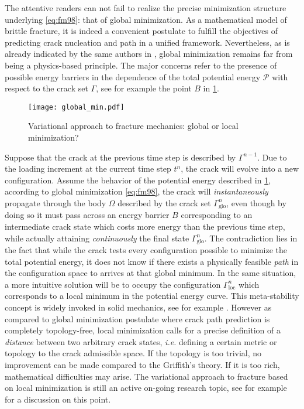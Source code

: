The attentive readers can not fail to realize the precise minimization structure underlying \eqref{eq:fm98}: that of global minimization. As a mathematical model of brittle fracture, it is indeed a convenient postulate to fulfill the objectives of predicting crack nucleation and path in a unified framework. Nevertheless, as is already indicated by the same authors in \cite{FrancfortMarigo:1998,ChambolleFrancfortMarigo:2009}, global minimization remains far from being a physics-based principle. The major concerns refer to the presence of possible energy barriers in the dependence of the total potential energy $\mathcal{P}$ with respect to the crack set $\Gamma$, see for example the point $B$ in \cref{fig:globalmin}.
\begin{figure}[htbp]
\centering
\texttt{[image: global\_min.pdf]}
\caption{Variational approach to fracture mechanics: global or local minimization?} \label{fig:globalmin}
\end{figure}
Suppose that the crack at the previous time step is described by $\Gamma^{n-1}$. Due to the loading increment at the current time step $t^n$, the crack will evolve into a new configuration. Assume the behavior of the potential energy described in \cref{fig:globalmin}, according to global minimization \eqref{eq:fm98}, the crack will \emph{instantaneously} propagate through the body $\Omega$ described by the crack set $\Gamma^n_\mathrm{glo}$, even though by doing so it must pass across an energy barrier $B$ corresponding to an intermediate crack state which costs more energy than the previous time step, while actually attaining \emph{continuously} the final state $\Gamma^n_\mathrm{glo}$. The contradiction lies in the fact that while the crack tests every configuration possible to minimize the total potential energy, it does not know if there exists a physically feasible \emph{path} in the configuration space to arrives at that global minimum. In the same situation, a more intuitive solution will be to occupy the configuration $\Gamma^n_\mathrm{loc}$ which corresponds to a local minimum in the potential energy curve. This meta-stability concept is widely invoked in solid mechanics, see for example \cite{Nguyen:2000}. However as compared to global minimization postulate where crack path prediction is completely topology-free, local minimization calls for a precise definition of a \emph{distance} between two arbitrary crack states, \emph{i.e.} defining a certain metric or topology to the crack admissible space. If the topology is too trivial, no improvement can be made compared to the Griffith's theory. If it is too rich, mathematical difficulties may arise. The variational approach to fracture based on local minimization is still an active on-going research topic, see for example \cite{CharlotteFrancfortMarigoTruskinovsky:2000,Negri:2010aa,ChambolleFrancfortMarigo:2009,Marigo:2010} for a discussion on this point.

